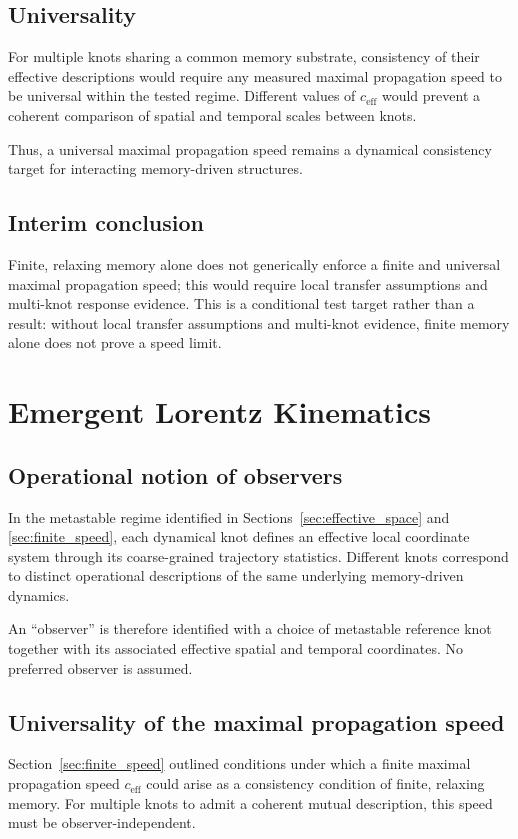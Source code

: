 \documentclass[reprint,amsmath,amssymb,aps,prl,nofootinbib,floatfix]{revtex4-2}
\begin{document}
\subsection{Universality}
For multiple knots sharing a common memory substrate, consistency of their effective descriptions would require any measured maximal propagation speed to be universal within the tested regime.
Different values of $c_{\mathrm{eff}}$ would prevent a coherent comparison of spatial and temporal scales between knots.

Thus, a universal maximal propagation speed remains a dynamical consistency target for interacting memory-driven structures.

\subsection{Interim conclusion}
Finite, relaxing memory alone does not generically enforce a finite and universal maximal propagation speed; this would require local transfer assumptions and multi-knot response evidence.
This is a conditional test target rather than a result: without local transfer assumptions and multi-knot evidence, finite memory alone does not prove a speed limit.

\section{Emergent Lorentz Kinematics}\label{sec:lorentz}
\subsection{Operational notion of observers}
In the metastable regime identified in Sections~\ref{sec:effective_space} and \ref{sec:finite_speed}, each dynamical knot defines an effective local coordinate system through its coarse-grained trajectory statistics.
Different knots correspond to distinct operational descriptions of the same underlying memory-driven dynamics.

An ``observer'' is therefore identified with a choice of metastable reference knot together with its associated effective spatial and temporal coordinates.
No preferred observer is assumed.

\subsection{Universality of the maximal propagation speed}

Section~\ref{sec:finite_speed} outlined conditions under which a finite maximal propagation speed $c_{\mathrm{eff}}$ could arise as a consistency condition of finite, relaxing memory.
For multiple knots to admit a coherent mutual description, this speed must be observer-independent.
\end{document}
